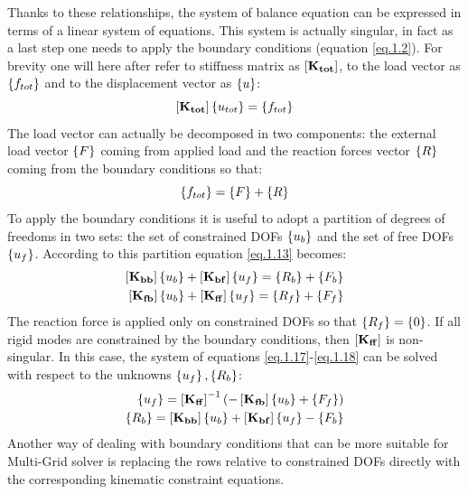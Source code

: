 Thanks to these relationships, the system of balance equation can be expressed in terms of a linear system of equations. This system is actually singular, in fact as a last step one needs to apply the boundary conditions (equation \eqref{eq.1.2}). For brevity one will here after refer to stiffness matrix as $\left[{\mathbf{K_{tot}}}\right]$, to the load vector as $\left\lbrace{f_{tot}}\right \rbrace$ and to the displacement vector as  $\left\lbrace{u}\right \rbrace$:
\begin{equation}
\label{eq.1.32}
\left[{\mathbf{K_{tot}}}\right]\left\lbrace{u_{tot}}\right \rbrace=\left\lbrace{f_{tot}}\right \rbrace
\end{equation} The load vector can actually be decomposed in two components: the external load vector $\left\lbrace{F}\right \rbrace$ coming from applied load and the reaction forces vector $\left\lbrace{R}\right \rbrace$ coming from the boundary conditions so that:
\begin{equation}
\left\lbrace{f_{tot}}\right \rbrace=\left\lbrace{F}\right \rbrace+\left\lbrace{R}\right \rbrace
\end{equation}
To apply the boundary conditions it is useful to adopt a partition of degrees of freedoms in two sets:
the set of constrained DOFs $\left\lbrace{u_b}\right \rbrace$ and the set of free DOFs $\left\lbrace{u_f}\right \rbrace$. According to this partition equation \eqref{eq.1.13} becomes:
\begin{eqnarray}
\label{eq.1.17}
\left[{\mathbf{K_{bb}}}\right]\left\lbrace{u_b}\right \rbrace+\left[{\mathbf{K_{bf}}}\right]\left\lbrace{u_f}\right \rbrace=\left\lbrace{R_b}\right \rbrace+\left\lbrace{F_b}\right \rbrace\\
\label{eq.1.18}
\left[{\mathbf{K_{fb}}}\right]\left\lbrace{u_b}\right \rbrace+\left[{\mathbf{K_{ff}}}\right]\left\lbrace{u_f}\right \rbrace=\left\lbrace{R_f}\right \rbrace+\left\lbrace{F_f}\right \rbrace
\end{eqnarray}
The reaction force is applied only on constrained DOFs so that $\left\lbrace{R_f}\right \rbrace=\left\lbrace{0}\right \rbrace$. If all rigid modes are constrained by the boundary conditions, then $\left[{\mathbf{K_{ff}}}\right]$ is non-singular.
 In this case, the system of equations \eqref{eq.1.17}-\eqref{eq.1.18} can be solved with respect to the unknowns $\left\lbrace{u_f}\right \rbrace,\left\lbrace{R_b}\right \rbrace$:
\begin{eqnarray}
\label{eq.1.19}
\left\lbrace{u_f}\right \rbrace=\left[{\mathbf{K_{ff}}}\right]^{-1}\left(-\left[{\mathbf{K_{fb}}}\right]\left\lbrace{u_b}\right \rbrace+\left\lbrace{F_f}\right \rbrace\right)\\
\label{eq.1.20}
\left\lbrace{R_b}\right \rbrace=\left[{\mathbf{K_{bb}}}\right]\left\lbrace{u_b}\right \rbrace+\left[{\mathbf{K_{bf}}}\right]\left\lbrace{u_f}\right \rbrace-\left\lbrace{F_b}\right \rbrace
\end{eqnarray}
Another way of dealing with boundary conditions that can be more suitable for Multi-Grid solver is replacing the rows relative to constrained DOFs directly with the corresponding kinematic constraint equations.
